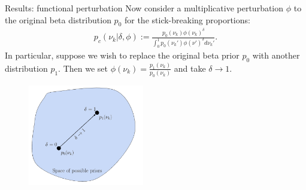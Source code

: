 \documentclass[10pt]{beamer}\usepackage[]{graphicx}\usepackage[]{color}
\begin{document}
\begin{frame}{Results: functional perturbation}
Now consider a multiplicative perturbation $\phi$ to
the original beta distribution $p_0$ for the stick-breaking proportions:
%
\begin{align*}
\label{eq:expon_perturb}
	p_c(\nu_k \vert \delta, \phi) :=
  \frac{p_{0}(\nu_k)\phi(\nu_k)^\delta}
       {\int_0^1 p_0(\nu_k')\phi(\nu')^\delta d\nu_k'}.
\end{align*}
\pause 
In particular, suppose we wish to replace the original beta prior $p_0$ with another distribution $p_1$. Then we set $\phi(\nu_k) = \frac{p_1(\nu_k)}{p_0(\nu_k)}$ and take $\delta \rightarrow 1$. 

\begin{figure}[!h]
\centering
\includegraphics[width = 0.45\textwidth]{./images/functional_perturbation.png}
\setlength{\textfloatsep}{-10pt}
\end{figure}

\end{frame}
\end{document}
